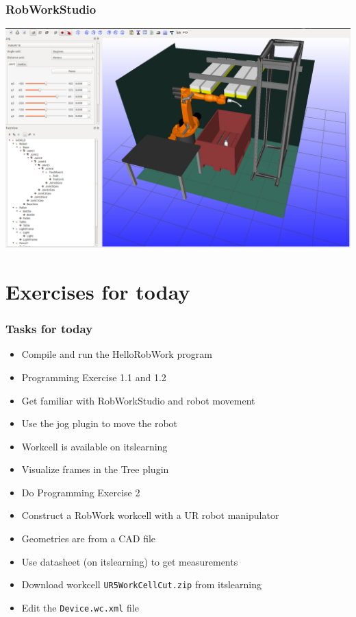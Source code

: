 \documentclass{beamer}
\begin{document}
\begin{frame}
\frametitle{RobWorkStudio}
  \includegraphics[width=\textwidth]{./graphics/robworkstudio}
\end{frame}


\section{Exercises for today}


\begin{frame}
  \frametitle{Tasks for today}
  \begin{itemize}
  \item Compile and run the HelloRobWork program
  \item Programming Exercise 1.1 and 1.2
  \item Get familiar with RobWorkStudio and robot movement
  \item Use the jog plugin to move the robot
  \item Workcell is available on itslearning
    \item Visualize frames in the Tree plugin
    \item Do Programming Exercise 2
  \item Construct a RobWork workcell with a UR robot manipulator
  \item Geometries are from a CAD file
  \item Use datasheet (on itslearning) to get measurements
  \item Download workcell \texttt{UR5WorkCellCut.zip} from itslearning
  \item Edit the \texttt{Device.wc.xml} file
  \end{itemize}
\end{frame}
\end{document}

